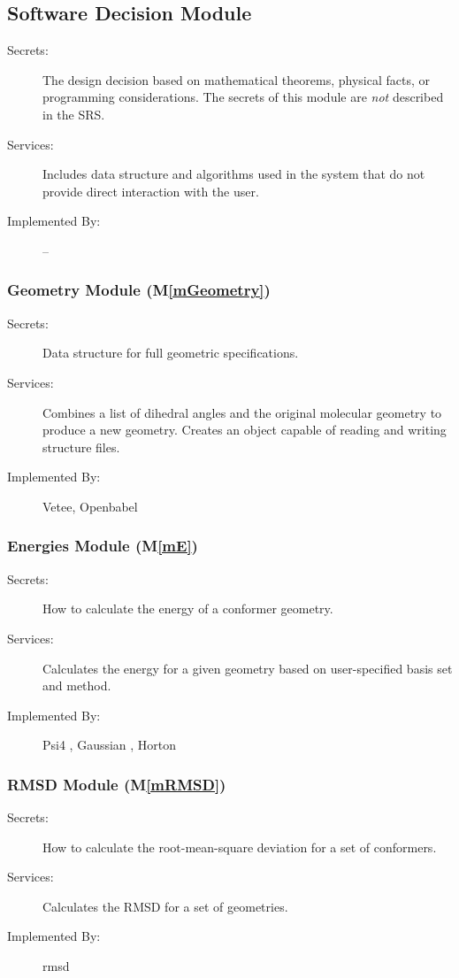 \documentclass[12pt, titlepage]{article}
\newcommand{\mref}[1]{M\ref{#1}}
\begin{document}
\subsection{Software Decision Module}

\begin{description}
\item[Secrets:] The design decision based on mathematical theorems, physical
  facts, or programming considerations. The secrets of this module are
  \emph{not} described in the SRS.
\item[Services:] Includes data structure and algorithms used in the system that
  do not provide direct interaction with the user. 
\item[Implemented By:] --
\end{description}

\subsubsection{Geometry Module (\mref{mGeometry})}
\begin{description}
	\item[Secrets:] Data structure for full geometric specifications.
	\item[Services:] Combines a list of dihedral angles and the original 
	molecular geometry to produce a new geometry. Creates an object capable of 
	reading and writing structure files.
	\item[Implemented By:] Vetee, Openbabel \citet{obabel} \citet{obabel-web}
\end{description}

\subsubsection{Energies Module (\mref{mE})}
\begin{description}
	\item[Secrets:] How to calculate the energy of a conformer geometry.
	\item[Services:] Calculates the energy for a given geometry based on 
	user-specified basis set and method. 
	\item[Implemented By:] Psi4 \citet{psi4}, Gaussian \citet{g16}, 
	Horton \citet{horton}
\end{description}

\subsubsection{RMSD Module (\mref{mRMSD})}
\begin{description}
	\item[Secrets:] How to calculate the root-mean-square deviation for a set 
	of conformers.
	\item[Services:] Calculates the RMSD for a set of geometries.
	\item[Implemented By:] rmsd\citet{rmsd-charnley}
\end{description}
\end{document}
